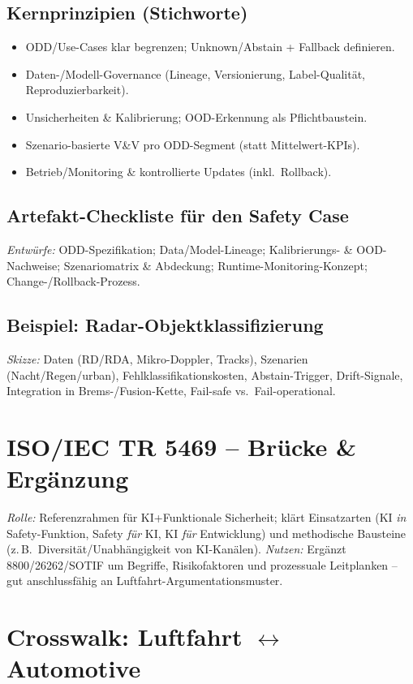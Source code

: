 \subsection{Kernprinzipien (Stichworte)}
\begin{itemize}
  \item ODD/Use-Cases klar begrenzen; Unknown/Abstain + Fallback definieren.
  \item Daten-/Modell-Governance (Lineage, Versionierung, Label-Qualität, Reproduzierbarkeit).
  \item Unsicherheiten \& Kalibrierung; OOD-Erkennung als Pflichtbaustein.
  \item Szenario-basierte V\&V pro ODD-Segment (statt Mittelwert-KPIs).
  \item Betrieb/Monitoring \& kontrollierte Updates (inkl.\ Rollback).
\end{itemize}

\subsection{Artefakt-Checkliste für den Safety Case}
\textit{Entwürfe:} ODD-Spezifikation; Data/Model-Lineage; Kalibrierungs- \& OOD-Nachweise; Szenariomatrix \& Abdeckung; Runtime-Monitoring-Konzept; Change-/Rollback-Prozess.

\subsection{Beispiel: Radar-Objektklassifizierung}
\textit{Skizze:} Daten (RD/RDA, Mikro-Doppler, Tracks), Szenarien (Nacht/Regen/urban), Fehlklassifikationskosten, Abstain-Trigger, Drift-Signale, Integration in Brems-/Fusion-Kette, Fail-safe vs.\ Fail-operational.

\section{ISO/IEC TR 5469 – Brücke \& Ergänzung}
\textit{Rolle:} Referenzrahmen für KI+Funktionale Sicherheit; klärt Einsatzarten (KI \emph{in} Safety-Funktion, Safety \emph{für} KI, KI \emph{für} Entwicklung) und methodische Bausteine (z.\,B.\ Diversität/Unabhängigkeit von KI-Kanälen). 
\textit{Nutzen:} Ergänzt 8800/26262/SOTIF um Begriffe, Risikofaktoren und prozessuale Leitplanken – gut anschlussfähig an Luftfahrt-Argumentationsmuster.

\section{Crosswalk: Luftfahrt \(\leftrightarrow\) Automotive}
